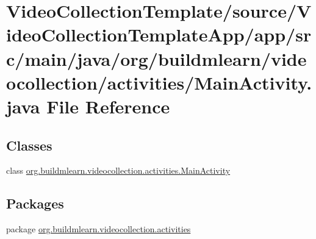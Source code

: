 \hypertarget{VideoCollectionTemplate_2source_2VideoCollectionTemplateApp_2app_2src_2main_2java_2org_2buildmle0ca82921566ce3f0ef578fb0f395c5b6}{}\section{Video\+Collection\+Template/source/\+Video\+Collection\+Template\+App/app/src/main/java/org/buildmlearn/videocollection/activities/\+Main\+Activity.java File Reference}
\label{VideoCollectionTemplate_2source_2VideoCollectionTemplateApp_2app_2src_2main_2java_2org_2buildmle0ca82921566ce3f0ef578fb0f395c5b6}
\subsection*{Classes}
\begin{DoxyCompactItemize}
\item 
class \hyperlink{classorg_1_1buildmlearn_1_1videocollection_1_1activities_1_1MainActivity}{org.\+buildmlearn.\+videocollection.\+activities.\+Main\+Activity}
\end{DoxyCompactItemize}
\subsection*{Packages}
\begin{DoxyCompactItemize}
\item 
package \hyperlink{namespaceorg_1_1buildmlearn_1_1videocollection_1_1activities}{org.\+buildmlearn.\+videocollection.\+activities}
\end{DoxyCompactItemize}
